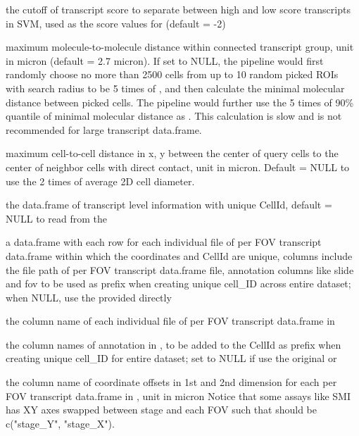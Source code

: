 \documentclass[letterpaper]{book}
\begin{document}
\begin{Arguments}
\begin{ldescription}
\item[\code{svmClass\_score\_cutoff}] the cutoff of transcript score to separate between high and low score transcripts in SVM, used as the score values for  (default = -2)

\item[\code{molecular\_distance\_cutoff}] maximum molecule-to-molecule distance within connected transcript group, unit in micron (default = 2.7 micron).
If set to NULL, the pipeline would first randomly choose no more than 2500 cells from up to 10 random picked ROIs with search radius to be 5 times of , and then calculate the minimal molecular distance between picked cells. The pipeline would further use the 5 times of 90\% quantile of minimal molecular distance as . This calculation is slow and is not recommended for large transcript data.frame.

\item[\code{cellular\_distance\_cutoff}] maximum cell-to-cell distance in x, y between the center of query cells to the center of neighbor cells with direct contact, unit in micron. Default = NULL to use the 2 times of average 2D cell diameter.

\item[\code{transcript\_df}] the data.frame of transcript level information with unique CellId, default = NULL to read from the 

\item[\code{transDF\_fileInfo}] a data.frame with each row for each individual file of per FOV transcript data.frame within which the coordinates and CellId are unique, columns include the file path of per FOV transcript data.frame file, annotation columns like slide and fov to be used as prefix when creating unique cell\_ID across entire dataset; when NULL, use the provided  directly

\item[\code{filepath\_coln}] the column name of each individual file of per FOV transcript data.frame in 

\item[\code{prefix\_colns}] the column names of annotation in , to be added to the CellId as prefix when creating unique cell\_ID for entire dataset; set to NULL if use the original  or 

\item[\code{fovOffset\_colns}] the column name of coordinate offsets in 1st and 2nd dimension for each per FOV transcript data.frame in , unit in micron
Notice that some assays like SMI has XY axes swapped between stage and each FOV such that  should be c("stage\_Y", "stage\_X").


\end{ldescription}
\end{Arguments}
\end{document}
